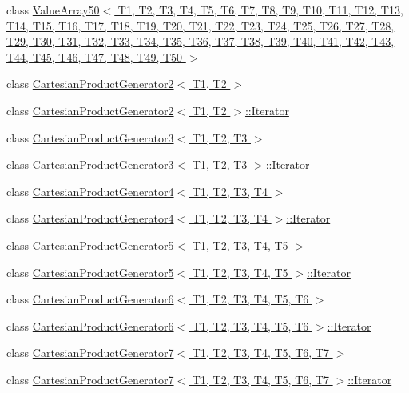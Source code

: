 \begin{DoxyCompactItemize}
\item 
class \hyperlink{classtesting_1_1internal_1_1ValueArray50}{\-Value\-Array50$<$ T1, T2, T3, T4, T5, T6, T7, T8, T9, T10, T11, T12, T13, T14, T15, T16, T17, T18, T19, T20, T21, T22, T23, T24, T25, T26, T27, T28, T29, T30, T31, T32, T33, T34, T35, T36, T37, T38, T39, T40, T41, T42, T43, T44, T45, T46, T47, T48, T49, T50 $>$}
\item 
class \hyperlink{classtesting_1_1internal_1_1CartesianProductGenerator2}{\-Cartesian\-Product\-Generator2$<$ T1, T2 $>$}
\item 
class \hyperlink{classtesting_1_1internal_1_1CartesianProductGenerator2_1_1Iterator}{\-Cartesian\-Product\-Generator2$<$ T1, T2 $>$\-::\-Iterator}
\item 
class \hyperlink{classtesting_1_1internal_1_1CartesianProductGenerator3}{\-Cartesian\-Product\-Generator3$<$ T1, T2, T3 $>$}
\item 
class \hyperlink{classtesting_1_1internal_1_1CartesianProductGenerator3_1_1Iterator}{\-Cartesian\-Product\-Generator3$<$ T1, T2, T3 $>$\-::\-Iterator}
\item 
class \hyperlink{classtesting_1_1internal_1_1CartesianProductGenerator4}{\-Cartesian\-Product\-Generator4$<$ T1, T2, T3, T4 $>$}
\item 
class \hyperlink{classtesting_1_1internal_1_1CartesianProductGenerator4_1_1Iterator}{\-Cartesian\-Product\-Generator4$<$ T1, T2, T3, T4 $>$\-::\-Iterator}
\item 
class \hyperlink{classtesting_1_1internal_1_1CartesianProductGenerator5}{\-Cartesian\-Product\-Generator5$<$ T1, T2, T3, T4, T5 $>$}
\item 
class \hyperlink{classtesting_1_1internal_1_1CartesianProductGenerator5_1_1Iterator}{\-Cartesian\-Product\-Generator5$<$ T1, T2, T3, T4, T5 $>$\-::\-Iterator}
\item 
class \hyperlink{classtesting_1_1internal_1_1CartesianProductGenerator6}{\-Cartesian\-Product\-Generator6$<$ T1, T2, T3, T4, T5, T6 $>$}
\item 
class \hyperlink{classtesting_1_1internal_1_1CartesianProductGenerator6_1_1Iterator}{\-Cartesian\-Product\-Generator6$<$ T1, T2, T3, T4, T5, T6 $>$\-::\-Iterator}
\item 
class \hyperlink{classtesting_1_1internal_1_1CartesianProductGenerator7}{\-Cartesian\-Product\-Generator7$<$ T1, T2, T3, T4, T5, T6, T7 $>$}
\item 
class \hyperlink{classtesting_1_1internal_1_1CartesianProductGenerator7_1_1Iterator}{\-Cartesian\-Product\-Generator7$<$ T1, T2, T3, T4, T5, T6, T7 $>$\-::\-Iterator}

\end{DoxyCompactItemize}

